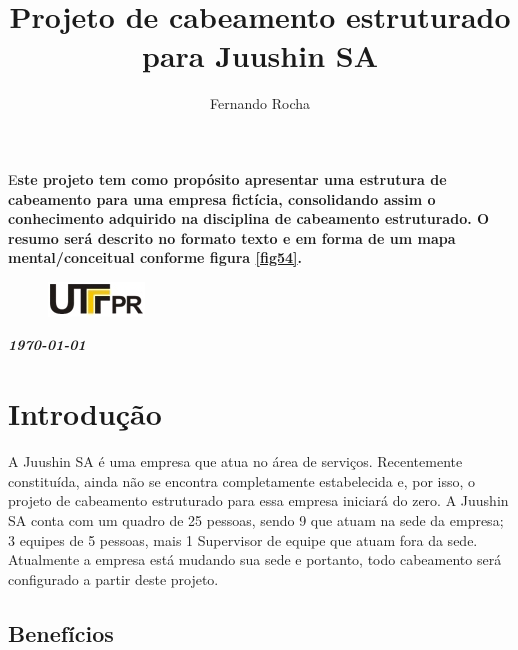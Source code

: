 \documentclass[	DIV=calc,%
paper=a4,%
fontsize=12pt,%
onecolumn]{scrartcl}	 					%
\title{Projeto de cabeamento estruturado para Juushin SA}
\author{Fernando Rocha }  	%
\date{}																				%
\newcommand{\initial}[1]{%
	\lettrine[lines=3,lhang=0.3,nindent=0em]{
		\color{DarkGoldenrod}
		{\textsf{#1}}}{}}
\begin{document}
	\maketitle
	\thispagestyle{fancy} 	
	\thispagestyle{empty}		%
	
	\initial{E}\textbf{ste projeto tem como propósito apresentar uma estrutura de cabeamento para uma empresa fictícia, consolidando assim o conhecimento adquirido na disciplina de cabeamento estruturado.
		O resumo será descrito no formato texto e em forma de um mapa mental/conceitual conforme figura \ref{fig54}.}
	
	
	\begin{figure}
		\centering
		\includegraphics{utfpr}
	\end{figure}
	
	\vspace{2cm}
	\centerline{\textit{\textbf{\today}}}
	
	\clearpage
	\renewcommand*\listfigurename{Lista de figuras}
	\listoffigures
	
	\renewcommand*\listtablename{Lista de tabelas}
	\listoftables
	
	
	
	
	\clearpage
	\renewcommand{\contentsname}{Sumário}
	\tableofcontents
	\clearpage
	
	
	\section{Introdução}
	A Juushin SA é uma empresa que atua no área de serviços. Recentemente constituída, ainda não se encontra completamente estabelecida e, por isso, o projeto de cabeamento estruturado para essa empresa iniciará do zero. A Juushin SA conta com um quadro de 25 pessoas, sendo 9 que atuam na sede da empresa; 3 equipes de 5 pessoas, mais 1 Supervisor de equipe que atuam fora da sede. Atualmente a empresa está mudando sua sede e portanto, todo cabeamento será configurado a partir deste projeto.
	
	\subsection{Benefícios}
	
\end{document}
